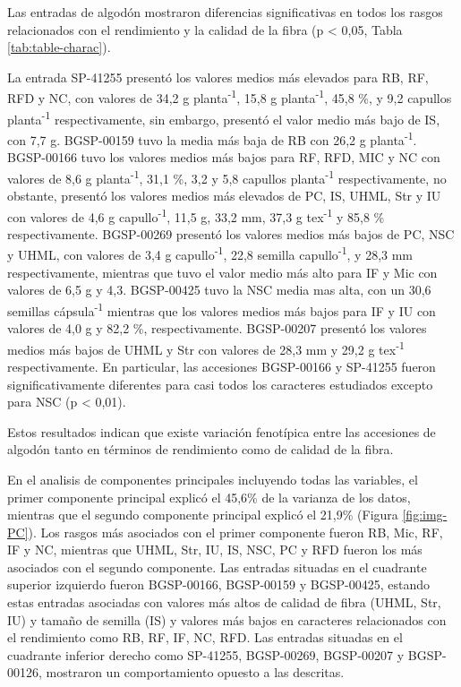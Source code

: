 \documentclass[12pt,oneside]{reedthesis}
\begin{document}
Las entradas de algodón mostraron diferencias significativas en todos los rasgos relacionados con el rendimiento y la calidad de la fibra (p \textless{} 0,05, Tabla \ref{tab:table-charac}).

La entrada SP-41255 presentó los valores medios más elevados para RB, RF, RFD y NC, con valores de 34,2 g planta\textsuperscript{-1}, 15,8 g planta\textsuperscript{-1}, 45,8 \%, y 9,2 capullos planta\textsuperscript{-1} respectivamente, sin embargo, presentó el valor medio más bajo de IS, con 7,7 g. BGSP-00159 tuvo la media más baja de RB con 26,2 g planta\textsuperscript{-1}. BGSP-00166 tuvo los valores medios más bajos para RF, RFD, MIC y NC con valores de 8,6 g planta\textsuperscript{-1}, 31,1 \%, 3,2 y 5,8 capullos planta\textsuperscript{-1} respectivamente, no obstante, presentó los valores medios más elevados de PC, IS, UHML, Str y IU con valores de 4,6 g capullo\textsuperscript{-1}, 11,5 g, 33,2 mm, 37,3 g tex\textsuperscript{-1} y 85,8 \% respectivamente. BGSP-00269 presentó los valores medios más bajos de PC, NSC y UHML, con valores de 3,4 g capullo\textsuperscript{-1}, 22,8 semilla capullo\textsuperscript{-1}, y 28,3 mm respectivamente, mientras que tuvo el valor medio más alto para IF y Mic con valores de 6,5 g y 4,3. BGSP-00425 tuvo la NSC media mas alta, con un 30,6 semillas cápsula\textsuperscript{-1} mientras que los valores medios más bajos para IF y IU con valores de 4,0 g y 82,2 \%, respectivamente. BGSP-00207 presentó los valores medios más bajos de UHML y Str con valores de 28,3 mm y 29,2 g tex\textsuperscript{-1} respectivamente. En particular, las accesiones BGSP-00166 y SP-41255 fueron significativamente diferentes para casi todos los caracteres estudiados excepto para NSC (p \textless{} 0,01).

Estos resultados indican que existe variación fenotípica entre las accesiones de algodón tanto en términos de rendimiento como de calidad de la fibra.

En el analisis de componentes principales incluyendo todas las variables, el primer componente principal explicó el 45,6\% de la varianza de los datos, mientras que el segundo componente principal explicó el 21,9\% (Figura \ref{fig:img-PC}). Los rasgos más asociados con el primer componente fueron RB, Mic, RF, IF y NC, mientras que UHML, Str, IU, IS, NSC, PC y RFD fueron los más asociados con el segundo componente. Las entradas situadas en el cuadrante superior izquierdo fueron BGSP-00166, BGSP-00159 y BGSP-00425, estando estas entradas asociadas con valores más altos de calidad de fibra (UHML, Str, IU) y tamaño de semilla (IS) y valores más bajos en caracteres relacionados con el rendimiento como RB, RF, IF, NC, RFD. Las entradas situadas en el cuadrante inferior derecho como SP-41255, BGSP-00269, BGSP-00207 y BGSP-00126, mostraron un comportamiento opuesto a las descritas.
\end{document}
